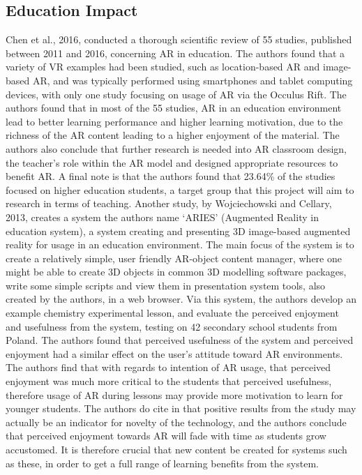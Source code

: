 \documentclass[11pt]{report}
\begin{document}
\subsection{Education Impact}
Chen et al., 2016\cite{Chen2016}, conducted a thorough scientific review of 55 studies, published between 2011 and 2016, concerning AR in education. The authors found that a variety of VR examples had been studied, such as location-based AR and image-based AR, and was typically performed using smartphones and tablet computing devices, with only one study focusing on usage of AR via the Occulus Rift. The authors found that in most of the 55 studies, AR in an education environment lead to better learning performance and higher learning motivation, due to the richness of the AR content leading to a higher enjoyment of the material. The authors also conclude that further research is needed into AR classroom design, the teacher's role within the AR model and designed appropriate resources to benefit AR. A final note is that the authors found that 23.64\% of the studies focused on higher education students, a target group that this project will aim to research in terms of teaching. Another study, by Wojciechowski and Cellary, 2013\cite{Wojciechowski2013}, creates a system the authors name `ARIES' (Augmented Reality in education system), a system creating and presenting 3D image-based augmented reality for usage in an education environment. The main focus of the system is to create a relatively simple, user friendly AR-object content manager, where one might be able to create 3D objects in common 3D modelling software packages, write some simple scripts and view them in presentation system tools, also created by the authors, in a web browser. Via this system, the authors develop an example chemistry experimental lesson, and evaluate the perceived enjoyment and usefulness from the system, testing on 42 secondary school students from Poland. The authors found that perceived usefulness of the system and perceived enjoyment had a similar effect on the user's attitude toward AR environments. The authors find that with regards to intention of AR usage, that perceived enjoyment was much more critical to the students that perceived usefulness, therefore usage of AR during lessons may provide more motivation to learn for younger students. The authors do cite in that positive results from the study may actually be an indicator for novelty of the technology, and the authors conclude that perceived enjoyment towards AR will fade with time as students grow accustomed. It is therefore crucial that new content be created for systems such as these, in order to get a full range of learning benefits from the system.
\end{document}
